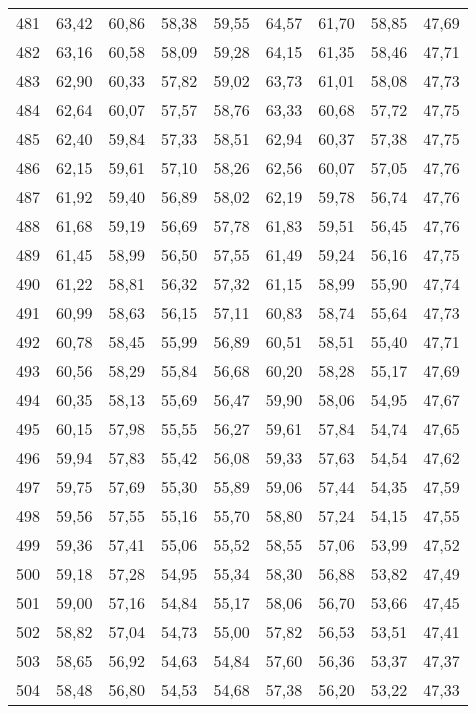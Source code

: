 \begin{longtable}{c c c c c c c c c}
481	& 63,42	& 60,86	& 58,38	& 59,55	& 64,57	& 61,70	& 58,85	& 47,69 \\
482	& 63,16	& 60,58	& 58,09	& 59,28	& 64,15	& 61,35	& 58,46	& 47,71 \\
483	& 62,90	& 60,33	& 57,82	& 59,02	& 63,73	& 61,01	& 58,08	& 47,73 \\
484	& 62,64	& 60,07	& 57,57	& 58,76	& 63,33	& 60,68	& 57,72	& 47,75 \\
485	& 62,40	& 59,84	& 57,33	& 58,51	& 62,94	& 60,37	& 57,38	& 47,75 \\
486	& 62,15	& 59,61	& 57,10	& 58,26	& 62,56	& 60,07	& 57,05	& 47,76 \\
487	& 61,92	& 59,40	& 56,89	& 58,02	& 62,19	& 59,78	& 56,74	& 47,76 \\
488	& 61,68	& 59,19	& 56,69	& 57,78	& 61,83	& 59,51	& 56,45	& 47,76 \\
489	& 61,45	& 58,99	& 56,50	& 57,55	& 61,49	& 59,24	& 56,16	& 47,75 \\
490	& 61,22	& 58,81	& 56,32	& 57,32	& 61,15	& 58,99	& 55,90	& 47,74 \\
491	& 60,99	& 58,63	& 56,15	& 57,11	& 60,83	& 58,74	& 55,64	& 47,73 \\
492	& 60,78	& 58,45	& 55,99	& 56,89	& 60,51	& 58,51	& 55,40	& 47,71 \\
493	& 60,56	& 58,29	& 55,84	& 56,68	& 60,20	& 58,28	& 55,17	& 47,69 \\
494	& 60,35	& 58,13	& 55,69	& 56,47	& 59,90	& 58,06	& 54,95	& 47,67 \\
495	& 60,15	& 57,98	& 55,55	& 56,27	& 59,61	& 57,84	& 54,74	& 47,65 \\
496	& 59,94	& 57,83	& 55,42	& 56,08	& 59,33	& 57,63	& 54,54	& 47,62 \\
497	& 59,75	& 57,69	& 55,30	& 55,89	& 59,06	& 57,44	& 54,35	& 47,59 \\
498	& 59,56	& 57,55	& 55,16	& 55,70	& 58,80	& 57,24	& 54,15	& 47,55 \\
499	& 59,36	& 57,41	& 55,06	& 55,52	& 58,55	& 57,06	& 53,99	& 47,52 \\
500	& 59,18	& 57,28	& 54,95	& 55,34	& 58,30	& 56,88	& 53,82	& 47,49 \\
501	& 59,00	& 57,16	& 54,84	& 55,17	& 58,06	& 56,70	& 53,66	& 47,45 \\
502	& 58,82	& 57,04	& 54,73	& 55,00	& 57,82	& 56,53	& 53,51	& 47,41 \\
503	& 58,65	& 56,92	& 54,63	& 54,84	& 57,60	& 56,36	& 53,37	& 47,37 \\
504	& 58,48	& 56,80	& 54,53	& 54,68	& 57,38	& 56,20	& 53,22	& 47,33 \\

\end{longtable}
